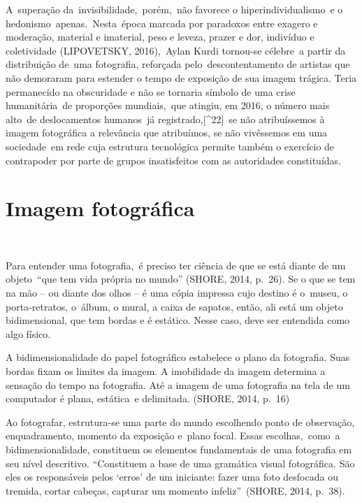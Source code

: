 \documentclass[
  letterpaper,
  a4paper,
  12pt]{scrbook}
\renewenvironment{quote}
  {\par\singlespacing\small\list{}{\rightmargin=0cm \leftmargin=4cm}%
   \item\relax}
  {\endlist}
\begin{document}
A~superação da~invisibilidade,~porém,~não favorece o
hiperindividualismo~e o hedonismo~apenas.~Nesta~época marcada por
paradoxos entre exagero e moderação, material e imaterial, peso e
leveza, prazer e dor, indivíduo e coletividade (LIPOVETSKY, 2016),~Aylan
Kurdi tornou-se célebre~a partir da distribuição de~uma fotografia,
reforçada pelo~descontentamento de artistas que não demoraram para
estender o tempo de exposição de sua imagem trágica. Teria permanecido
na obscuridade e não se tornaria símbolo de uma crise humanitária~de
proporções mundiais,~que atingiu, em 2016, o número mais alto~de
deslocamentos humanos~já registrado,{[}\^{}22{]}~se não atribuíssemos à
imagem fotográfica a relevância que atribuímos, se não vivêssemos em uma
sociedade~em rede cuja estrutura tecnológica permite também o exercício
de contrapoder por parte de grupos insatisfeitos com as autoridades
constituídas.~

\hypertarget{imagem-fotogruxe1fica}{%
\section{Imagem fotográfica~}\label{imagem-fotogruxe1fica}}

~

Para entender uma fotografia,~é preciso ter ciência de que se está
diante de um objeto~``que tem vida própria no mundo'' (SHORE, 2014,
p.~26). Se o que se tem na mão -- ou diante dos olhos -- é uma cópia
impressa cujo destino é o~museu, o porta-retratos, o~álbum, o mural, a
caixa de sapatos, então, ali está um objeto bidimensional, que tem
bordas e é estático. Nesse caso, deve ser entendida como algo físico.~ ~

\begin{quote}
A bidimensionalidade do papel fotográfico estabelece o plano da
fotografia. Suas bordas fixam os limites da imagem. A imobilidade da
imagem determina a sensação do tempo na fotografia. Até a imagem de uma
fotografia na tela de um computador é plana, estática~e delimitada.
(SHORE, 2014, p.~16) ~
\end{quote}

Ao fotografar, estrutura-se uma parte do mundo escolhendo ponto de
observação, enquadramento, momento da exposição e~plano focal. Essas
escolhas,~como~a bidimensionalidade, constituem os elementos
fundamentais de uma fotografia em seu nível descritivo. ``Constituem a
base de uma gramática visual fotográfica. São eles os responsáveis pelos
`erros' de um iniciante: fazer uma foto desfocada ou tremida, cortar
cabeças, capturar um momento infeliz''~(SHORE, 2014, p.~38).
\end{document}
